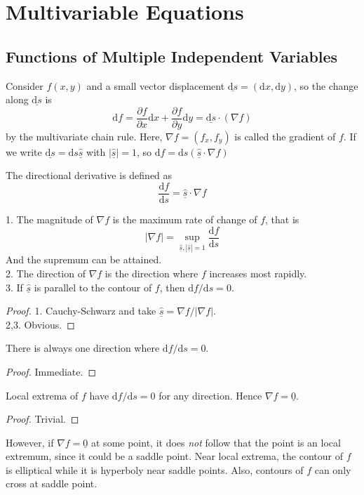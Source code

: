 \section{Multivariable Equations}
\subsection{Functions of Multiple Independent Variables}
Consider $f(x,y)$ and a small vector displacement $\underline{\mathrm ds}=(\mathrm dx,\mathrm dy)$, so the change along $\underline{\mathrm ds}$ is
$$\mathrm df=\frac{\partial f}{\partial x}\mathrm dx+\frac{\partial f}{\partial y}\mathrm dy=\underline{\mathrm ds}\cdot(\nabla f)$$
by the multivariate chain rule.
Here, $\nabla f=(f_x,f_y)$ is called the gradient of $f$.
If we write $\underline{\mathrm ds}=\mathrm ds\underline{\hat{s}}$ with $|\underline{\hat{s}}|=1$, so $\mathrm df=\mathrm ds(\underline{\hat{s}}\cdot\nabla f)$
\begin{definition}
    The directional derivative is defined as
    $$\frac{\mathrm df}{\mathrm ds}=\underline{\hat{s}}\cdot\nabla f$$
\end{definition}
\begin{proposition}
    1. The magnitude of $\nabla f$ is the maximum rate of change of $f$, that is
    $$|\nabla f|=\sup_{\underline{\hat{s}},|\underline{\hat{s}}|=1}\frac{\mathrm df}{\mathrm ds}$$
    And the supremum can be attained.\\
    2. The direction of $\nabla f$ is the direction where $f$ increases most rapidly.\\
    3. If $\underline{\hat{s}}$ is parallel to the contour of $f$, then $\mathrm df/\mathrm ds=0$.
\end{proposition}
\begin{proof}
    1. Cauchy-Schwarz and take $\underline{\hat{s}}=\nabla{f}/|\nabla f|$.\\
    2,3. Obvious.
\end{proof}
\begin{corollary}
    There is always one direction where $\mathrm df/\mathrm ds=0$.
\end{corollary}
\begin{proof}
    Immediate.
\end{proof}
\begin{proposition}
    Local extrema of $f$ have $\mathrm df/\mathrm ds=0$ for any direction.
    Hence $\nabla f=\underline{0}$.
\end{proposition}
\begin{proof}
    Trivial.
\end{proof}
However, if $\nabla f=\underline{0}$ at some point, it does \textit{not} follow that the point is an local extremum, since it could be a saddle point.
Near local extrema, the contour of $f$ is elliptical while it is hyperboly near saddle points.
Also, contours of $f$ can only cross at saddle point.
